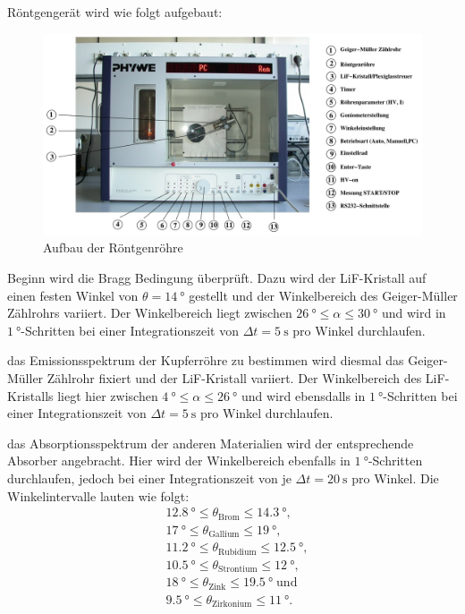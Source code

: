 \justifying Röntgengerät wird wie folgt aufgebaut:
\begin{figure}[H]
    \centering
    \includegraphics[width=\textwidth]{./images/Röntgenröhre.jpg}
    \caption{Aufbau der Röntgenröhre \cite{V602}}
\end{figure}
\justifying Beginn wird die Bragg Bedingung überprüft. Dazu wird der LiF-Kristall auf einen festen Winkel von $\theta=\SI{14}{\degree}$ gestellt und der
Winkelbereich des Geiger-Müller Zählrohrs variiert. Der Winkelbereich liegt zwischen $\SI{26}{\degree}\leq\alpha\leq\SI{30}{\degree}$ und wird in
$\SI{1}{\degree}$-Schritten bei einer Integrationszeit von $\Delta t=\SI{5}{\second}$ pro Winkel durchlaufen. 

\justifying das Emissionsspektrum der Kupferröhre zu bestimmen wird diesmal das Geiger-Müller Zählrohr fixiert und der LiF-Kristall
variiert. Der Winkelbereich des LiF-Kristalls liegt hier zwischen $\SI{4}{\degree}\leq\alpha\leq\SI{26}{\degree}$ und wird ebensdalls in 
$\SI{1}{\degree}$-Schritten bei einer Integrationszeit von $\Delta t=\SI{5}{\second}$ pro Winkel durchlaufen.

\justifying das Absorptionsspektrum der anderen Materialien wird der entsprechende Absorber angebracht. Hier wird der Winkelbereich
ebenfalls in $\SI{1}{\degree}$-Schritten durchlaufen, jedoch bei einer Integrationszeit von je $\Delta t=\SI{20}{\second}$ pro Winkel.
Die Winkelintervalle lauten wie folgt:\\
\begin{align*}
    &\SI{12.8}{\degree}\leq\theta_{\text{Brom}}\leq\SI{14.3}{\degree},\\ 
    &\SI{17}{\degree}\leq\theta_{\text{Gallium}}\leq\SI{19}{\degree},\\
    &\SI{11.2}{\degree}\leq\theta_{\text{Rubidium}}\leq\SI{12.5}{\degree},\\
    &\SI{10.5}{\degree}\leq\theta_{\text{Strontium}}\leq\SI{12}{\degree},\\
    &\SI{18}{\degree}\leq\theta_{\text{Zink}}\leq\SI{19.5}{\degree}\;\text{und}\\
    &\SI{9.5}{\degree}\leq\theta_{\text{Zirkonium}}\leq\SI{11}{\degree}.
\end{align*}


